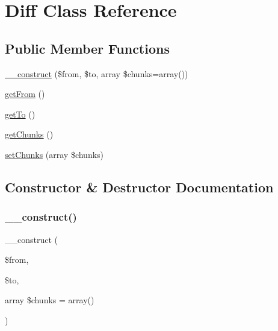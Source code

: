 \hypertarget{class_sebastian_bergmann_1_1_diff_1_1_diff}{}\section{Diff Class Reference}
\label{class_sebastian_bergmann_1_1_diff_1_1_diff}
\subsection*{Public Member Functions}
\begin{DoxyCompactItemize}
\item 
\mbox{\hyperlink{class_sebastian_bergmann_1_1_diff_1_1_diff_abf9b4ef70d776d01658c964fe0e3b7f0}{\+\_\+\+\_\+construct}} (\$from, \$to, array \$chunks=array())
\item 
\mbox{\hyperlink{class_sebastian_bergmann_1_1_diff_1_1_diff_a28bd887dc9236a9c87f1d5cbe9c5875d}{get\+From}} ()
\item 
\mbox{\hyperlink{class_sebastian_bergmann_1_1_diff_1_1_diff_addfa0ac916b451938b5ad7aceeb03820}{get\+To}} ()
\item 
\mbox{\hyperlink{class_sebastian_bergmann_1_1_diff_1_1_diff_af50e54fefaca69486871fe92cf470628}{get\+Chunks}} ()
\item 
\mbox{\hyperlink{class_sebastian_bergmann_1_1_diff_1_1_diff_a9cc885382e8c61c7bf75b12ac08e9ce6}{set\+Chunks}} (array \$chunks)
\end{DoxyCompactItemize}


\subsection{Constructor \& Destructor Documentation}
\mbox{\label{class_sebastian_bergmann_1_1_diff_1_1_diff_abf9b4ef70d776d01658c964fe0e3b7f0}} 
\subsubsection{\texorpdfstring{\+\_\+\+\_\+construct()}{\_\_construct()}}
{\footnotesize\ttfamily \+\_\+\+\_\+construct (\begin{DoxyParamCaption}\item[{}]{\$from,  }\item[{}]{\$to,  }\item[{array}]{\$chunks = {\ttfamily array()} }\end{DoxyParamCaption})}


